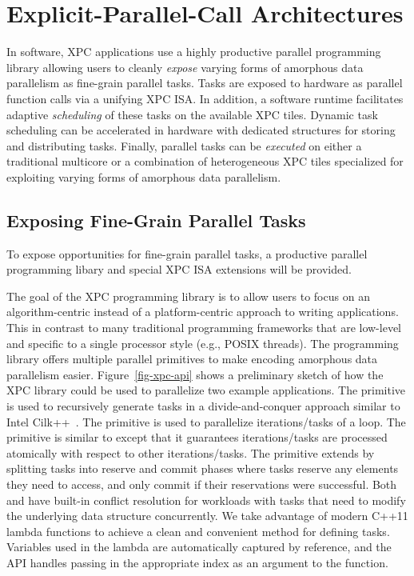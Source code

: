 
\section{Explicit-Parallel-Call Architectures}
\label{sec-xpc}

In software, XPC applications use a highly productive parallel
programming library allowing users to cleanly \emph{expose} varying forms
of amorphous data parallelism as fine-grain parallel tasks. Tasks are
exposed to hardware as parallel function calls via a unifying XPC ISA. In
addition, a software runtime facilitates adaptive \emph{scheduling} of
these tasks on the available XPC tiles. Dynamic task scheduling can be
accelerated in hardware with dedicated structures for storing and
distributing tasks. Finally, parallel tasks can be \emph{executed} on
either a traditional multicore or a combination of heterogeneous XPC
tiles specialized for exploiting varying forms of amorphous data
parallelism.

\subsection{Exposing Fine-Grain Parallel Tasks}

To expose opportunities for fine-grain parallel tasks, a productive
parallel programming libary and special XPC ISA extensions will be
provided.

The goal of the XPC programming library is to allow users to focus on an
algorithm-centric instead of a platform-centric approach to writing
applications. This in contrast to many traditional programming frameworks
that are low-level and specific to a single processor style (e.g., POSIX
threads). The programming library offers multiple parallel primitives to
make encoding amorphous data parallelism easier. Figure~\ref{fig-xpc-api}
shows a preliminary sketch of how the XPC library could be used to
parallelize two example applications. The  primitive is used to
recursively generate tasks in a divide-and-conquer approach similar to
Intel Cilk++~\cite{cilk-spec2010}. The  primitive is
used to parallelize iterations/tasks of a loop. The 
primitive is similar to  except that it guarantees
iterations/tasks are processed atomically with respect to other
iterations/tasks. The  primitive extends
 by splitting tasks into reserve and commit phases where
tasks reserve any elements they need to access, and only commit if their
reservations were successful. Both  and
 have built-in conflict resolution for workloads
with tasks that need to modify the underlying data structure
concurrently. We take advantage of modern C++11 lambda functions to
achieve a clean and convenient method for defining tasks. Variables used
in the lambda are automatically captured by reference, and the API
handles passing in the appropriate index as an argument to the function.


